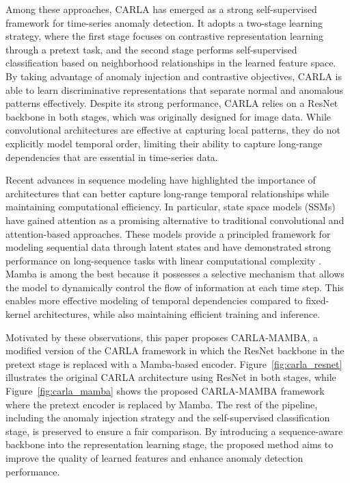 \documentclass[runningheads]{llncs}
\begin{document}
Among these approaches, CARLA \cite{darban2024carla} has emerged as a strong self-supervised framework for time-series anomaly detection. It adopts a two-stage learning strategy, where the first stage focuses on contrastive representation learning through a pretext task, and the second stage performs self-supervised classification based on neighborhood relationships in the learned feature space. By taking advantage of anomaly injection and contrastive objectives, CARLA is able to learn discriminative representations that separate normal and anomalous patterns effectively. Despite its strong performance, CARLA relies on a ResNet backbone \cite{fawaz2019deep} in both stages, which was originally designed for image data. While convolutional architectures are effective at capturing local patterns, they do not explicitly model temporal order, limiting their ability to capture long-range dependencies that are essential in time-series data.

Recent advances in sequence modeling have highlighted the importance of architectures that can better capture long-range temporal relationships while maintaining computational efficiency. In particular, state space models (SSMs) have gained attention as a promising alternative to traditional convolutional and attention-based approaches. These models provide a principled framework for modeling sequential data through latent states and have demonstrated strong performance on long-sequence tasks with linear computational complexity \cite{gu2022efficiently}. Mamba \cite{gu2023mamba} is among the best because it possesses a selective mechanism that allows the model to dynamically control the flow of information at each time step. This enables more effective modeling of temporal dependencies compared to fixed-kernel architectures, while also maintaining efficient training and inference.

Motivated by these observations, this paper proposes CARLA-MAMBA, a modified version of the CARLA framework in which the ResNet backbone in the pretext stage is replaced with a Mamba-based encoder. Figure~\ref{fig:carla_resnet} illustrates the original CARLA architecture using ResNet in both stages, while Figure~\ref{fig:carla_mamba} shows the proposed CARLA-MAMBA framework where the pretext encoder is replaced by Mamba. The rest of the pipeline, including the anomaly injection strategy and the self-supervised classification stage, is preserved to ensure a fair comparison. By introducing a sequence-aware backbone into the representation learning stage, the proposed method aims to improve the quality of learned features and enhance anomaly detection performance.
\end{document}
